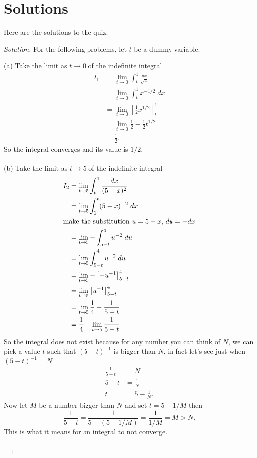 \section*{Solutions}
Here are the solutions to the quiz.
\begin{proof}[Solution]
For the following problems, let $t$ be a dummy variable.

(a) Take the limit as $t\to 0$ of the indefinite integral
\begin{align*}
I_1&=\lim_{t\to 0}\int_t^1\frac{dx}{\sqrt{x}}\\
   &=\lim_{t\to 0}\int_t^1x^{-1/2}\;dx\\
   &=\lim_{t\to 0}\left[\frac{1}{2}x^{1/2}\right]_t^1\\
   &=\lim_{t\to 0}\frac{1}{2}-\frac{1}{2}t^{1/2}\\
   &=\frac{1}{2}.
\end{align*}
So the integral converges and its value is $1/2$.
\\\\
(b) Take the limit as $t\to 5$ of the indefinite integral
\begin{align*}
I_2&=\lim_{t\to 5}\int_t^1\frac{dx}{(5-x)^2}\\
   &=\lim_{t\to 5}\int_1^t(5-x)^{-2}\;dx\\
\shortintertext{make the substitution $u=5-x$, $du=-dx$}
   &=\lim_{t\to 5}-\int_{5-t}^4u^{-2}\;du\\
   &=\lim_{t\to 5}\int_{5-t}^4 u^{-2}\;du\\
   &=\lim_{t\to 5}-\left[-u^{-1}\right]_{5-t}^4\\
   &=\lim_{t\to 5}\left[u^{-1}\right]_{5-t}^4\\
   &=\lim_{t\to 5}\frac{1}{4}-\frac{1}{5-t}\\
   &=\frac{1}{4}-\lim_{t\to 5}\frac{1}{5-t}\\
\end{align*}
So the integral does not exist because for any number you can think of $N$,
we can pick a value $t$ such that $(5-t)^{-1}$ is bigger than $N$, in
fact let's see just when $(5-t)^{-1}=N$
\begin{align*}
\frac{1}{5-t}&=N\\
5-t&=\frac{1}{N}\\
t&=5-\frac{1}{N}.
\end{align*}
Now let $M$ be a number bigger than $N$ and set $t=5-1/M$ then
\[
\frac{1}{5-t}=\frac{1}{5-\left(5-1/M\right)}=\frac{1}{1/M}=M>N.
\]
This is what it means for an integral to not converge.
\\\\

\end{proof}

